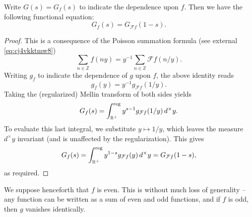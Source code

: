 \documentclass[reqno]{amsart}  \numberwithin{theorem}{section} \numberwithin{equation}{section}
\begin{document}
\begin{lemma}\label{lemma:cj4vkjxr7m}
  Write $G(s) = G_f(s)$ to indicate the dependence upon $f$.  Then we have the following functional equation:
  \begin{equation*}
    G_f(s) = G_{\mathcal{F} f}(1-s).
  \end{equation*}
\end{lemma}
\begin{proof}
  This is a consequence of the Poisson summation formula (see external \eqref{eq:cj4vkktmw8})
  \begin{equation*}
    \sum_{n \in \mathbb{Z} } f (n y) = y^{-1} \sum_{n \in \mathbb{Z} } \mathcal{F} f (n / y).
  \end{equation*}
  Writing $g_f$ to indicate the dependence of $g$ upon $f$, the above identity reads
  \begin{equation*}
    g_f(y) = y^{-1} g_{\mathcal{F} f}(1/y).
  \end{equation*}
  Taking the (regularized) Mellin transform of both sides yields
  \begin{equation*}
    G_f(s) = \int_{\mathbb{R}^+}^{\operatorname{reg}} y^{s-1} g_{\mathcal{F} f}(1/y) \,d^\times y.
  \end{equation*}
  To evaluate this last integral, we substitute $y \mapsto 1/y$, which leaves the measure $d^\times y$ invariant (and is unaffected by the regularization).  This gives
  \begin{equation*}
    G_f(s) = \int_{\mathbb{R}^+}^{\operatorname{reg}} y^{1-s} g_{\mathcal{F} f}(y) \,d^\times y = G_{\mathcal{F} f}(1-s),
  \end{equation*}
  as required.
\end{proof}


We suppose henceforth that $f$ is even.  This is without much loss of generality -- any function can be written as a sum of even and odd functions, and if $f$ is odd, then $g$ vanishes identically.
\end{document}
